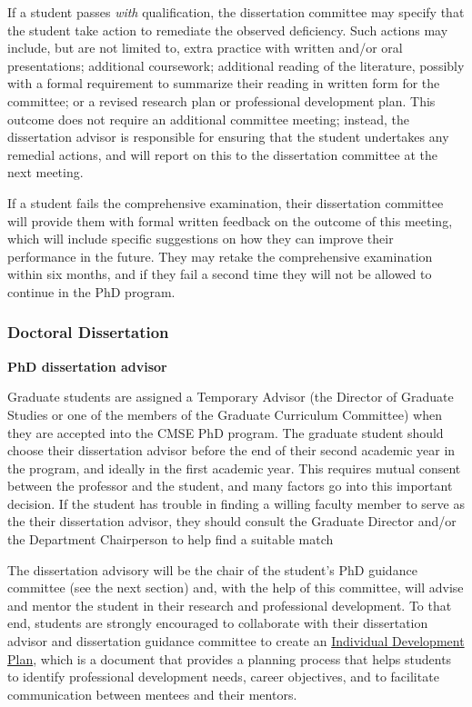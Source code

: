 If a student passes \textit{with} qualification, the dissertation committee
may specify that the student take action to remediate the observed
deficiency.  Such actions may include, but are not limited to, extra
practice with written and/or oral presentations; additional
coursework; additional reading of the literature, possibly with a
formal requirement to summarize their reading in written form for the
committee; or a revised research plan or professional development
plan.  This outcome does not require an additional committee meeting;
instead, the dissertation advisor is responsible for ensuring that the
student undertakes any remedial actions, and will report on this to
the dissertation committee at the next meeting.

If a student fails the comprehensive examination, their dissertation
committee will provide them with formal written feedback on the
outcome of this meeting, which will include specific suggestions on
how they can improve their performance in the future.  They may retake
the comprehensive examination within six months, and if they fail a
second time they will not be allowed to continue in the PhD program.


\vspace{3mm}
\subsubsection{Doctoral Dissertation}
\label{sec:phd_dissertation}

\vspace{3mm}
\noindent
\textbf{PhD dissertation advisor}

Graduate students are assigned a Temporary Advisor (the Director of
Graduate Studies or  one of the members of the Graduate Curriculum Committee) when
they are accepted into the CMSE PhD program. The graduate student should choose
their dissertation advisor before the end of their second academic year in
the program, and ideally in the first academic year.  This requires mutual consent between the professor and
the student, and many factors go into this important decision.  If the
student has trouble in finding a willing faculty member to serve as
the their dissertation advisor, they should consult the Graduate
Director and/or the Department Chairperson to help find a suitable match

The dissertation advisory will be the chair of the student's PhD
guidance committee (see the next section) and, with the help of this
committee, will advise and mentor the student in their research and
professional development.   To that end, students are strongly encouraged to collaborate with their
dissertation advisor and dissertation guidance committee to create an \href{http://caffe.grd.msu.edu/IDP}{Individual
Development Plan}, which is a document that provides a planning
process that helps students to identify professional development
needs, career objectives, and to facilitate communication between
mentees and their mentors.

